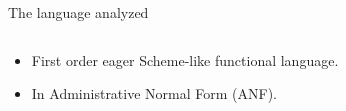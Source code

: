 \documentclass[xcolor=x11names,compress,mathserif]{beamer}
\renewcommand{\(}{\begin{columns}}
\renewcommand{\)}{\end{columns}}
\newcommand{\<}[1]{\begin{column}{#1}}
\renewcommand{\>}{\end{column}}
\begin{document}


\begin{frame}{The language analyzed}
\begin{columns}
  \begin{column}[T]{0.45\textwidth}
\small
    \begin{itemize} \itemsep0.75em
    \item First order eager Scheme-like functional language.
    \item In Administrative Normal Form (ANF).
    \end{itemize}
\normalsize
  \end{column}
  \begin{column}[T]{0.55\textwidth}
    
  \end{column}
\end{columns}
\end{frame}


\end{document}
